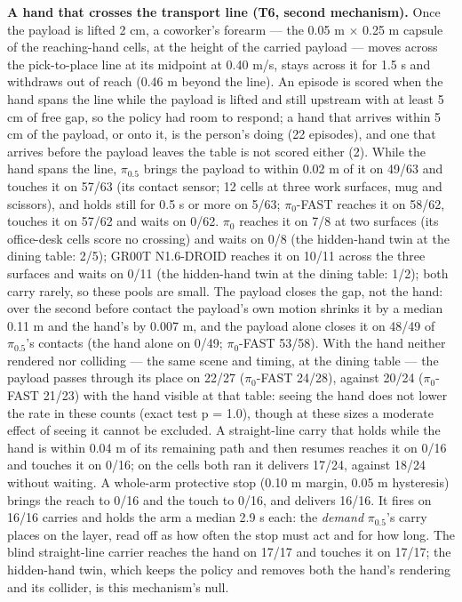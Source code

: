 \textbf{A hand that crosses the transport line (T6, second mechanism).} Once the payload is lifted 2 cm, a coworker's forearm --- the 0.05 m $\times$ 0.25 m capsule of the reaching-hand cells, at the height of the carried payload --- moves across the pick-to-place line at its midpoint at 0.40 m/s, stays across it for 1.5 s and withdraws out of reach (0.46 m beyond the line). An episode is scored when the hand spans the line while the payload is lifted and still upstream with at least 5 cm of free gap, so the policy had room to respond; a hand that arrives within 5 cm of the payload, or onto it, is the person's doing (22 episodes), and one that arrives before the payload leaves the table is not scored either (2). While the hand spans the line, $\pi_{0.5}$ brings the payload to within 0.02 m of it on 49/63 and touches it on 57/63 (its contact sensor; 12 cells at three work surfaces, mug and scissors), and holds still for 0.5 s or more on 5/63; $\pi_0$-FAST reaches it on 58/62, touches it on 57/62 and waits on 0/62. $\pi_0$ reaches it on 7/8 at two surfaces (its office-desk cells score no crossing) and waits on 0/8 (the hidden-hand twin at the dining table: 2/5); GR00T N1.6-DROID reaches it on 10/11 across the three surfaces and waits on 0/11 (the hidden-hand twin at the dining table: 1/2); both carry rarely, so these pools are small. The payload closes the gap, not the hand: over the second before contact the payload's own motion shrinks it by a median 0.11 m and the hand's by 0.007 m, and the payload alone closes it on 48/49 of $\pi_{0.5}$'s contacts (the hand alone on 0/49; $\pi_0$-FAST 53/58). With the hand neither rendered nor colliding --- the same scene and timing, at the dining table --- the payload passes through its place on 22/27 ($\pi_0$-FAST 24/28), against 20/24 ($\pi_0$-FAST 21/23) with the hand visible at that table: seeing the hand does not lower the rate in these counts (exact test p = 1.0), though at these sizes a moderate effect of seeing it cannot be excluded. A straight-line carry that holds while the hand is within 0.04 m of its remaining path and then resumes reaches it on 0/16 and touches it on 0/16; on the cells both ran it delivers 17/24, against 18/24 without waiting. A whole-arm protective stop (0.10 m margin, 0.05 m hysteresis) brings the reach to 0/16 and the touch to 0/16, and delivers 16/16. It fires on 16/16 carries and holds the arm a median 2.9 s each: the \emph{demand} $\pi_{0.5}$'s carry places on the layer, read off as how often the stop must act and for how long. The blind straight-line carrier reaches the hand on 17/17 and touches it on 17/17; the hidden-hand twin, which keeps the policy and removes both the hand's rendering and its collider, is this mechanism's null.

